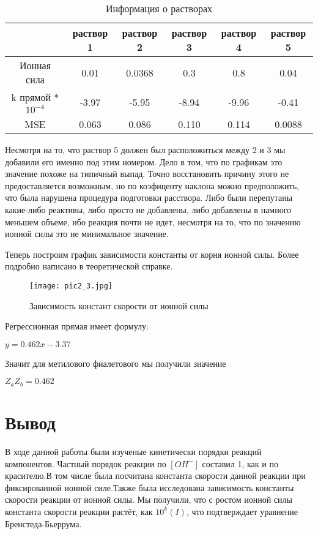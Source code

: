 \documentclass{article}
\begin{document}
\begin{table}[H]
    \centering
    \begin{tabular}{|c|c|c|c|c|c|} \hline
         & раствор 1 & раствор 2 & раствор 3 & раствор 4 & раствор 5\\ \hline
         Ионная сила & 0.01 & 0.0368 & 0.3 & 0.8 & 0.04\\ \hline
         k прямой * $10^{-4}$& -3.97 & -5.95 & -8.94 & -9.96 & -0.41 \\ \hline
         MSE & 0.063 & 0.086 & 0.110 & 0.114 & 0.0088\\ \hline
    \end{tabular}
    \caption{Информация о растворах}
\end{table}

Несмотря на то, что раствор 5 должен был расположиться между 2 и 3 мы добавили его именно под этим номером. Дело в том, что по графикам это значение похоже на типичный выпад. Точно восстановить причину этого не предоставляется возможным, но по коэфиценту наклона можно предположить, что была нарушена процедура подготовки расствора. Либо были перепутаны какие-либо реактивы, либо просто не добавлены, либо добавлены в намного меньшем объеме, ибо реакция почти не идет, несмотря на то, что по значению ионной силы это не минимальное значение.

Теперь построим график зависимости константы от корня ионной силы. Более подробно написано в теоретической справке.

\begin{figure}[H]
    \centering
    \texttt{[image: pic2\_3.jpg]}
    \caption{Зависимость констант скорости от ионной силы}
\end{figure}

Регрессионная прямая имеет формулу:
\begin{center}
    $y = 0.462x - 3.37$
\end{center}

Значит для метилового фиалетового мы получили значение
\begin{center}
    $Z_aZ_b = 0.462$
\end{center}

\section{Вывод}
В ходе данной работы были изученые кинетически порядки реакций компонентов. Частный порядок реакции по $[OH^-]$ составил 1, как и по красителю.В том числе была посчитана константа скорости данной реакции при фиксированной ионной силе.Также была исследована зависимость константы скорости реакции от ионной силы. Мы получили, что с ростом ионной силы константа скорости реакции растёт, как $10^k(I)$, что подтверждает уравнение Бренстеда-Бьеррума.
\end{document}
